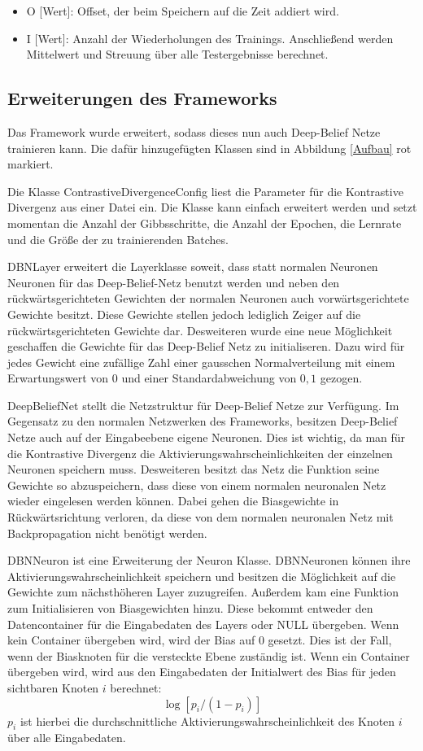 \documentclass[12pt]{article}
\begin{document}
\begin{itemize}
\item O [Wert]:	Offset, der beim Speichern auf die Zeit addiert wird.
\item I [Wert]: Anzahl der Wiederholungen des Trainings. Anschließend werden Mittelwert und Streuung über alle Testergebnisse berechnet.
\end{itemize}

\subsection{Erweiterungen des Frameworks}
Das Framework wurde erweitert, sodass dieses nun auch Deep-Belief Netze trainieren kann. Die dafür hinzugefügten Klassen sind in Abbildung \ref{Aufbau} rot markiert.

Die Klasse ContrastiveDivergenceConfig liest die Parameter für die Kontrastive Divergenz aus einer Datei ein. Die Klasse kann einfach erweitert werden und setzt momentan die Anzahl der Gibbsschritte, die Anzahl der Epochen, die Lernrate und die Größe der zu trainierenden Batches.

DBNLayer erweitert die Layerklasse soweit, dass statt normalen Neuronen Neuronen für das Deep-Belief-Netz benutzt werden und neben den rückwärtsgerichteten Gewichten der normalen Neuronen auch vorwärtsgerichtete Gewichte besitzt. Diese Gewichte stellen jedoch lediglich Zeiger auf die rückwärtsgerichteten Gewichte dar. Desweiteren wurde eine neue Möglichkeit geschaffen die Gewichte für das Deep-Belief Netz zu initialiseren. Dazu wird für jedes Gewicht eine zufällige Zahl einer gausschen Normalverteilung mit einem Erwartungswert von 0 und einer Standardabweichung von $0,1$ gezogen.

DeepBeliefNet stellt die Netzstruktur für Deep-Belief Netze zur Verfügung. Im Gegensatz zu den normalen Netzwerken des Frameworks, besitzen Deep-Belief Netze auch auf der Eingabeebene eigene Neuronen. Dies ist wichtig, da man für die Kontrastive Divergenz die Aktivierungswahrscheinlichkeiten der einzelnen Neuronen speichern muss. Desweiteren besitzt das Netz die Funktion seine Gewichte so abzuspeichern, dass diese von einem normalen neuronalen Netz wieder eingelesen werden können. Dabei gehen die Biasgewichte in Rückwärtsrichtung verloren, da diese von dem normalen neuronalen Netz mit Backpropagation nicht benötigt werden.

DBNNeuron ist eine Erweiterung der Neuron Klasse. DBNNeuronen können ihre Aktivierungswahrscheinlichkeit speichern und besitzen die Möglichkeit auf die Gewichte zum nächsthöheren Layer zuzugreifen. Außerdem kam eine Funktion zum Initialisieren von Biasgewichten hinzu. Diese bekommt entweder den Datencontainer für die Eingabedaten des Layers oder NULL übergeben. Wenn kein Container übergeben wird, wird der Bias auf 0 gesetzt. Dies ist der Fall, wenn der Biasknoten für die versteckte Ebene zuständig ist. Wenn ein Container übergeben wird, wird aus den Eingabedaten der Initialwert des Bias für jeden sichtbaren Knoten $i$ berechnet:
\begin{equation}
\log [p_i/(1-p_i)]
\end{equation}
$p_i$ ist hierbei die durchschnittliche Aktivierungswahrscheinlichkeit des Knoten $i$ über alle Eingabedaten.
\end{document}
